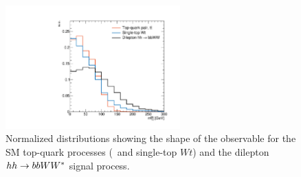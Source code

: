 \begin{figure}[!htb]
    \begin{center}
        \includegraphics[width=0.6\textwidth]{figures/search_hh/signal_pheno/shape_plots/hh_shape_plot_mt2_bb}
        \caption{
            Normalized distributions showing the shape of the \mtbb observable for the SM
            top-quark processes (\ttbar~and single-top $Wt$) and the dilepton $hh \rightarrow bbWW^*$ signal process.
        }
        \label{fig:hh_shape_mtbb}
    \end{center}
\end{figure}


